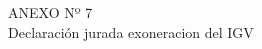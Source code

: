 \begin{center}
    \vspace*{\fill} %
    \Huge %
    ANEXO Nº 7 \\
    Declaración jurada exoneracion del IGV
    \vspace*{\fill} %
\end{center}